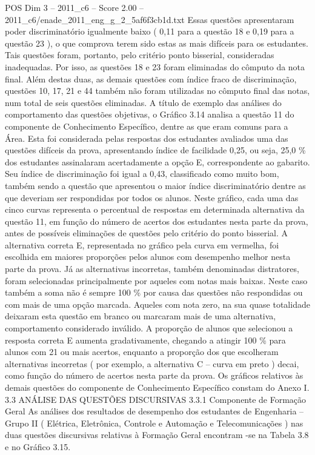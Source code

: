 \begin{textsample}{POS Dim 3 – 2011\_c6 – Score 2.00 – 2011\_c6/enade\_2011\_eng\_g\_2\_5af6f3cb1d.txt}
Essas questões apresentaram poder discriminatório igualmente baixo ( 0,11 para a questão 18 e 0,19 para a questão 23 ), o que comprova terem sido estas as mais difíceis para os estudantes.
Tais questões foram, portanto, pelo critério ponto bisserial, consideradas inadequadas.
Por isso, as questões 18 e 23 foram eliminadas do cômputo da nota final.
Além destas duas, as demais questões com índice fraco de discriminação, questões 10, 17, 21 e 44 também não foram utilizadas no cômputo final das notas, num total de seis questões eliminadas.
A título de exemplo das análises do comportamento das questões objetivas, o Gráfico 3.14 analisa a questão 11 do componente de Conhecimento Específico, dentre as que eram comuns para a Área.
Esta foi considerada pelas respostas dos estudantes avaliados uma das questões difíceis da prova, apresentando índice de facilidade 0,25, ou seja, 25,0 \% dos estudantes assinalaram acertadamente a opção E, correspondente ao gabarito.
Seu índice de discriminação foi igual a 0,43, classificado como muito bom, também sendo a questão que apresentou o maior índice discriminatório dentre as que deveriam ser respondidas por todos os alunos.
Neste gráfico, cada uma das cinco curvas representa o percentual de respostas em determinada alternativa da questão 11, em função do número de acertos dos estudantes nesta parte da prova, antes de possíveis eliminações de questões pelo critério do ponto bisserial.
A alternativa correta E, representada no gráfico pela curva em vermelha, foi escolhida em maiores proporções pelos alunos com desempenho melhor nesta parte da prova.
Já as alternativas incorretas, também denominadas distratores, foram selecionadas principalmente por aqueles com notas mais baixas.
Neste caso também a soma não é sempre 100 \% por causa das questões não respondidas ou com mais de uma opção marcada.
Aqueles com nota zero, na sua quase totalidade deixaram esta questão em branco ou marcaram mais de uma alternativa, comportamento considerado inválido.
A proporção de alunos que selecionou a resposta correta E aumenta gradativamente, chegando a atingir 100 \% para alunos com 21 ou mais acertos, enquanto a proporção dos que escolheram alternativas incorretas ( por exemplo, a alternativa C – curva em preto ) decai, como função do número de acertos nesta parte da prova.
Os gráficos relativos às demais questões do componente de Conhecimento Específico constam do Anexo I. 3.3 ANÁLISE DAS QUESTÕES DISCURSIVAS 3.3.1 Componente de Formação Geral As análises dos resultados de desempenho dos estudantes de Engenharia – Grupo II ( Elétrica, Eletrônica, Controle e Automação e Telecomunicações ) nas duas questões discursivas relativas à Formação Geral encontram -se na Tabela 3.8 e no Gráfico 3.15.

\end{textsample}
